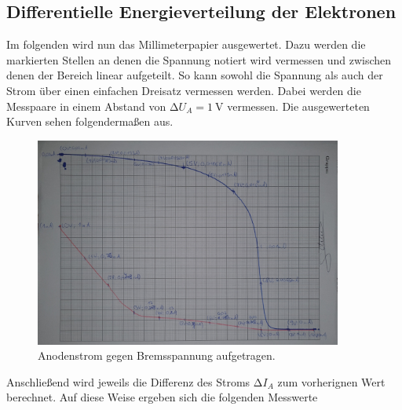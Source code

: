 \subsection{Differentielle Energieverteilung der Elektronen}

Im folgenden wird nun das Millimeterpapier ausgewertet. Dazu werden die markierten Stellen an denen die Spannung notiert wird vermessen und 
zwischen denen der Bereich linear aufgeteilt. So kann sowohl die Spannung als auch der Strom über einen einfachen Dreisatz vermessen werden.
Dabei werden die Messpaare in einem Abstand von $\increment U_A =\qty{1}{\volt}$ vermessen. Die ausgewerteten Kurven sehen folgendermaßen aus.

\begin{figure}[H]
    \centering
    \includegraphics[width=0.9\textwidth]{Bremsspannung.jpg}
    \caption{Anodenstrom gegen Bremsspannung aufgetragen.}
\end{figure}

\noindent Anschließend wird jeweils die Differenz des Stroms $\increment I_A$ zum vorherignen Wert berechnet.
Auf diese Weise ergeben sich die folgenden Messwerte


